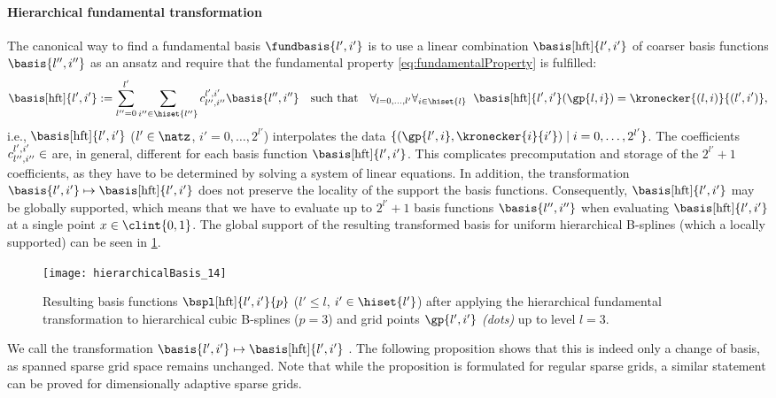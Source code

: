 \paragraph{Hierarchical fundamental transformation}

The canonical way to find a fundamental basis $\fundbasis{l',i'}$ is to
use a linear combination $\basis[\hft]{l',i'}$
of coarser basis functions $\basis{l'',i''}$ as an ansatz
and require that the fundamental property \eqref{eq:fundamentalProperty}
is fulfilled:
\begin{equation}
  \basis[\hft]{l',i'}
  := \sum_{l''=0}^{l'} \sum_{i'' \in \hiset{l''}}
  c_{l'',i''}^{l',i'} \basis{l'',i''}
  \quad\text{such that}\quad
  \fafalarge{l = 0, \dotsc, l'}{i \in \hiset{l}}{
    \basis[\hft]{l',i'}(\gp{l,i}) = \kronecker{(l,i)}{(l',i')},
  }
\end{equation}
i.e., $\basis[\hft]{l',i'}$ ($l' \in \natz$, $i' = 0, \dotsc, 2^{l'}$)
interpolates the data
$\{(\gp{l',i}, \kronecker{i}{i'}) \mid i = 0, \dotsc, 2^{l'}\}$.
The coefficients $c_{l'',i''}^{l',i'} \in \real$
are, in general, different for each basis function $\basis[\hft]{l',i'}$.
This complicates precomputation and storage of the $2^{l'} + 1$ coefficients,
as they have to be determined by solving a system of linear equations.
In addition, the transformation $\basis{l',i'} \mapsto \basis[\hft]{l',i'}$
does not preserve the locality of the support the basis functions.
Consequently, $\basis[\hft]{l',i'}$ may be globally supported,
which means that we have to evaluate up to $2^{l'} + 1$ basis functions
$\basis{l'',i''}$ when evaluating $\basis[\hft]{l',i'}$ at a single point
$x \in \clint{0, 1}$.
The global support of the resulting transformed basis
for uniform hierarchical B-splines (which a locally supported)
can be seen in \cref{fig:hftBSpline}.

\begin{SCfigure}
  \texttt{[image: hierarchicalBasis\_14]}%
  \caption[%
    Hierarchical B-splines transformed via the hierarchical fundamental
    transformation%
  ]{%
    Resulting basis functions $\bspl[\hft]{l',i'}{p}$
    ($l' \le l$, $i' \in \hiset{l'}$)
    after applying the hierarchical fundamental transformation
    to hierarchical cubic B-splines ($p = 3$) and
    grid points $\gp{l',i'}$ \emph{(dots)} up to level $l = 3$.%
  }%
  \label{fig:hftBSpline}%
\end{SCfigure}

We call the transformation $\basis{l',i'} \mapsto \basis[\hft]{l',i'}$
\term{\hftr}.
The following proposition shows that this is indeed only a change of basis,
as spanned sparse grid space remains unchanged.
Note that while the proposition is formulated for regular sparse grids,
a similar statement can be proved for dimensionally adaptive sparse grids.

